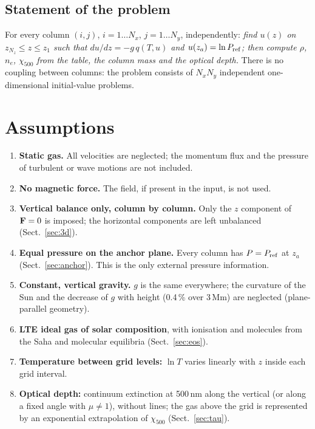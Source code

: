 \subsection{Statement of the problem}
For every column $(i,j)$, $i=1\dots N_x$, $j=1\dots N_y$, independently: \emph{find $u(z)$ on $z_{N_z}\le z\le z_1$ such
that $du/dz=-g\,q(T,u)$ and $u(z_a)=\ln P_{\rm ref}$; then compute $\rho$, $n_e$, $\chi_{500}$ from the table, the column
mass and the optical depth.} There is no coupling between columns: the problem consists of $N_xN_y$ independent
one-dimensional initial-value problems.

\section{Assumptions}\label{sec:assume}
\begin{enumerate}[label=\textbf{A\arabic*.},leftmargin=2.2em]
\item \textbf{Static gas.} All velocities are neglected; the momentum flux and the pressure of turbulent or wave motions are
not included.
\item \textbf{No magnetic force.} The field, if present in the input, is not used.
\item \textbf{Vertical balance only, column by column.} Only the $z$ component of $\mathbf F=0$ is imposed; the horizontal
components are left unbalanced (Sect.~\ref{sec:3d}).
\item \textbf{Equal pressure on the anchor plane.} Every column has $P=P_{\rm ref}$ at $z_a$ (Sect.~\ref{sec:anchor}). This is
the only external pressure information.
\item \textbf{Constant, vertical gravity.} $g$ is the same everywhere; the curvature of the Sun and the decrease of $g$ with
height (0.4\,\% over 3\,Mm) are neglected (plane-parallel geometry).
\item \textbf{LTE ideal gas of solar composition}, with ionisation and molecules from the Saha and molecular equilibria
(Sect.~\ref{sec:eos}).
\item \textbf{Temperature between grid levels:} $\ln T$ varies linearly with $z$ inside each grid interval.
\item \textbf{Optical depth:} continuum extinction at 500\,nm along the vertical (or along a fixed angle with $\mu\ne1$),
without lines; the gas above the grid is represented by an exponential extrapolation of $\chi_{500}$ (Sect.~\ref{sec:tau}).
\end{enumerate}

